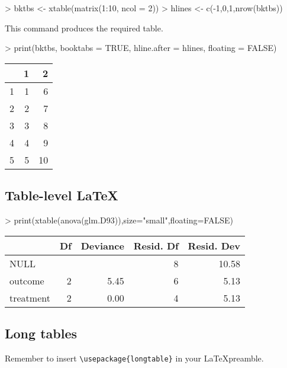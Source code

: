 \documentclass[letterpaper]{article}
\begin{document}
\begin{Schunk}
\begin{Sinput}
> bktbs <- xtable(matrix(1:10, ncol = 2))
> hlines <- c(-1,0,1,nrow(bktbs))
\end{Sinput}
\end{Schunk}
This command produces the required table.
\begin{Schunk}
\begin{Sinput}
> print(bktbs, booktabs = TRUE, hline.after = hlines, floating = FALSE)
\end{Sinput}
% latex table generated in R 3.1.1 by xtable 1.7-3 package
% 
\begin{tabular}{rrr}
  \toprule
 & 1 & 2 \\ 
  \midrule
1 &   1 &   6 \\ 
   \midrule
2 &   2 &   7 \\ 
  3 &   3 &   8 \\ 
  4 &   4 &   9 \\ 
  5 &   5 &  10 \\ 
   \bottomrule
\end{tabular}\end{Schunk}


\subsection{Table-level \LaTeX}
\begin{Schunk}
\begin{Sinput}
> print(xtable(anova(glm.D93)),size="small",floating=FALSE)
\end{Sinput}
% latex table generated in R 3.1.1 by xtable 1.7-3 package
% 
{\small
\begin{tabular}{lrrrr}
  \hline
 & Df & Deviance & Resid. Df & Resid. Dev \\ 
  \hline
NULL &  &  & 8 & 10.58 \\ 
  outcome & 2 & 5.45 & 6 & 5.13 \\ 
  treatment & 2 & 0.00 & 4 & 5.13 \\ 
   \hline
\end{tabular}
}\end{Schunk}


\subsection{Long tables}
Remember to insert \verb|\usepackage{longtable}| in your \LaTeX preamble.
\end{document}
